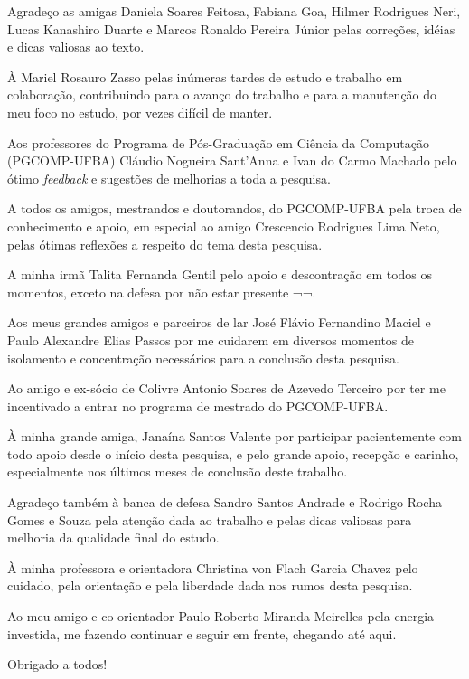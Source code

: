 Agradeço as amigas
Daniela Soares Feitosa,
Fabiana Goa,
Hilmer Rodrigues Neri,
Lucas Kanashiro Duarte e
Marcos Ronaldo Pereira Júnior
pelas correções, idéias e dicas valiosas ao texto.

À
Mariel Rosauro Zasso
pelas inúmeras tardes de estudo e trabalho em colaboração, contribuindo para o
avanço do trabalho e para a manutenção do meu foco no estudo, por vezes difícil
de manter.

Aos professores do Programa de Pós-Graduação em Ciência da Computação (PGCOMP-UFBA)
Cláudio Nogueira Sant'Anna e
Ivan do Carmo Machado
pelo ótimo {\it feedback} e sugestões de melhorias a toda a pesquisa.

A todos os amigos, mestrandos e doutorandos, do PGCOMP-UFBA pela troca de
conhecimento e apoio, em especial ao amigo Crescencio Rodrigues Lima Neto,
pelas ótimas reflexões a respeito do tema desta pesquisa.

A minha irmã
Talita Fernanda Gentil
pelo apoio e descontração em todos os momentos, exceto na defesa por não estar
presente ¬¬.

Aos meus grandes amigos e parceiros de lar
José Flávio Fernandino Maciel e
Paulo Alexandre Elias Passos
por me cuidarem em diversos momentos de isolamento e concentração necessários para
a conclusão desta pesquisa.

Ao amigo e ex-sócio de Colivre
Antonio Soares de Azevedo Terceiro
por ter me incentivado a entrar no programa de mestrado do PGCOMP-UFBA.

À minha grande amiga,
Janaína Santos Valente
por participar pacientemente com todo apoio desde o início desta pesquisa, e
pelo grande apoio, recepção e carinho, especialmente nos últimos meses de
conclusão deste trabalho.

Agradeço também à banca de defesa
Sandro Santos Andrade e
Rodrigo Rocha Gomes e Souza
pela atenção dada ao trabalho e pelas dicas valiosas para melhoria da qualidade
final do estudo.

À minha professora e orientadora
Christina von Flach Garcia Chavez
pelo cuidado, pela orientação e pela liberdade dada nos rumos desta pesquisa.

Ao meu amigo e co-orientador
Paulo Roberto Miranda Meirelles
pela energia investida, me fazendo continuar e seguir em frente, chegando até
aqui.

Obrigado a todos!
